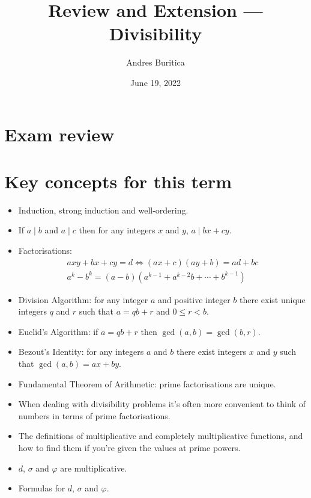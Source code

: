 \documentclass{article}
\title{Review and Extension --- Divisibility}
\author{Andres Buritica}
\date{June 19, 2022}
\begin{document}
\maketitle
\section{Exam review}
\newpage
\section{Key concepts for this term}
  \begin{itemize}
    \item Induction, strong induction and well-ordering.
    \item If $a\mid b$ and $a\mid c$ then for any integers $x$ and $y$, $a\mid
      bx+cy$.
    \item Factorisations:
        \begin{align*}
          axy+bx+cy=d\iff (ax+c)(ay+b)=ad+bc \\
          a^k-b^k=(a-b)\left(a^{k-1}+a^{k-2}b+\cdots+b^{k-1}\right)
        \end{align*}
    \item Division Algorithm: for any integer $a$ and positive integer $b$ there
      exist unique integers $q$ and $r$ such that $a=qb+r$ and $0\le r<b$.
    \item Euclid's Algorithm: if $a=qb+r$ then $\gcd(a,b)=\gcd(b,r)$.
    \item Bezout's Identity: for any integers $a$ and $b$ there exist integers
      $x$ and $y$ such that $\gcd(a,b)=ax+by$.
    \item Fundamental Theorem of Arithmetic: prime factorisations are unique.
    \item When dealing with divisibility problems it's often more convenient to
      think of numbers in terms of prime factorisations.
    \item The definitions of multiplicative and completely multiplicative
      functions, and how to find them if you're given the values at prime
      powers.
    \item $d$, $\sigma$ and $\varphi$ are multiplicative.
    \item Formulas for $d$, $\sigma$ and $\varphi$.
  \end{itemize}
\end{document}
